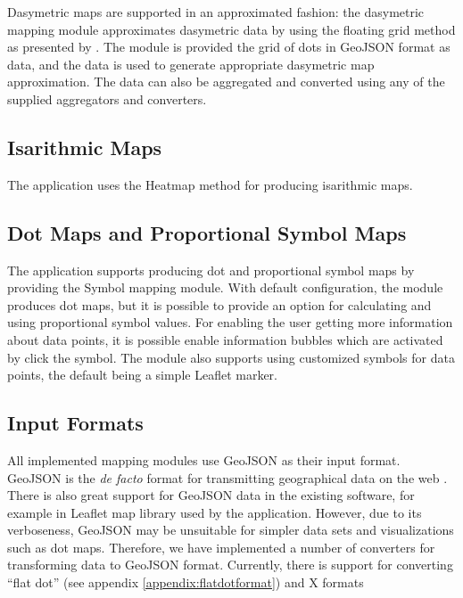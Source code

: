 Dasymetric maps are supported in an approximated fashion: the dasymetric mapping module  approximates dasymetric data by using the floating grid method as presented by \citet{langford_generating_1994}. The module is provided the grid of dots in GeoJSON format as data, and the data is used to generate appropriate dasymetric map approximation. The data can also be aggregated and converted using any of the supplied aggregators and converters.


\subsection{Isarithmic Maps}

The application uses the Heatmap method for producing isarithmic maps. 

\subsection{Dot Maps and Proportional Symbol Maps}

The application supports producing dot and proportional symbol maps by providing the Symbol mapping module. With default configuration, the module produces dot maps, but it is possible to provide an option for calculating and using proportional symbol values. For enabling the user getting more information about data points, it is possible enable information bubbles which are activated by click the symbol. The module also supports using customized symbols for data points, the default being a simple Leaflet marker.

\subsection{Input Formats}

All implemented mapping modules use GeoJSON as their input format. GeoJSON is the \emph{de facto} format for transmitting geographical data on the web \citep{bostock_code_2013}. There is also great support for GeoJSON data in the existing software, for example in Leaflet map library used by the application. However, due to its verboseness, GeoJSON may be unsuitable for simpler data sets and visualizations such as dot maps. Therefore, we have implemented a number of converters for transforming data to GeoJSON format. Currently, there is support for converting ``flat dot'' (see appendix \ref{appendix:flatdotformat}) and X formats 

